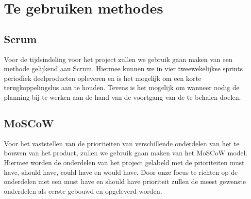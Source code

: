 \section{Te gebruiken methodes}

\subsection{Scrum}
Voor de tijdsindeling voor het project zullen we gebruik gaan maken van een methode gelijkend aan Scrum. Hiermee kunnen we in vier tweewekelijkse sprints periodiek deelproducten opleveren en is het mogelijk om een korte terugkoppelingslus aan te houden. Tevens is het mogelijk om wanneer nodig de planning bij te werken aan de hand van de voortgang van de te behalen doelen. 

\subsection{MoSCoW}
Voor het vaststellen van de prioriteiten van verschillende onderdelen van het te bouwen van het product, zullen we gebruik gaan maken van het MoSCoW model. Hiermee worden de onderdelen van het project gelabeld met de prioriteiten must have, should have, could have en would have. Door onze focus te richten op de onderdelen met een must have en should have prioriteit zullen de meest gewenste onderdelen als eerste gebouwd en opgeleverd worden.